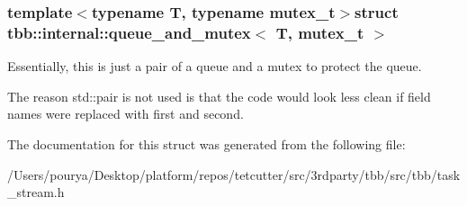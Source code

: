 \subsubsection*{template$<$typename T, typename mutex\+\_\+t$>$struct tbb\+::internal\+::queue\+\_\+and\+\_\+mutex$<$ T, mutex\+\_\+t $>$}

Essentially, this is just a pair of a queue and a mutex to protect the queue. 

The reason std\+::pair is not used is that the code would look less clean if field names were replaced with \textquotesingle{}first\textquotesingle{} and \textquotesingle{}second\textquotesingle{}. 

The documentation for this struct was generated from the following file\+:\begin{DoxyCompactItemize}
\item 
/\+Users/pourya/\+Desktop/platform/repos/tetcutter/src/3rdparty/tbb/src/tbb/task\+\_\+stream.\+h\end{DoxyCompactItemize}
